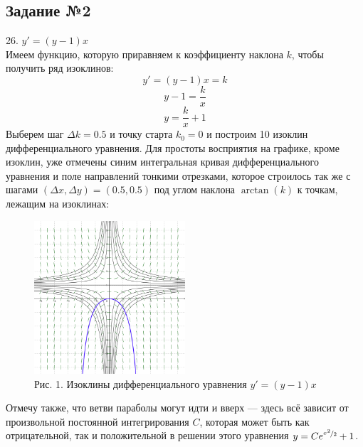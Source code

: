 \documentclass[a3paper,14pt]{article}
\begin{document}
\subsection*{\centering Задание №2}
26. $y'=(y-1)x$ \\
Имеем функцию, которую приравняем к коэффициенту наклона $k$, чтобы получить ряд изоклинов:
$$y'=(y-1)x=k$$
$$y-1=\frac{k}{x}$$
$$y=\frac{k}{x} + 1$$
Выберем шаг $\Delta k = 0.5$ и точку старта $k_0 = 0$ и построим 10 изоклин дифференциального уравнения. Для простоты восприятия на графике, кроме изоклин, уже отмечены синим интегральная кривая дифференциального уравнения и поле направлений тонкими отрезками, которое строилось так же с шагами $(\Delta x, \Delta y) = (0.5, 0.5)$ под углом наклона $\arctan(k)$ к точкам, лежащим на изоклинах:
\begin{figure}[h]
    \centering \includegraphics[width=0.5\textwidth]{isoclines.png}
    \caption{Рис. 1. Изоклины дифференциального уравнения $y'=(y-1)x$}
\end{figure}

\noindent Отмечу также, что ветви параболы могут идти и вверх --- здесь всё зависит от произвольной постоянной интегрирования $C$, которая может быть как отрицательной, так и положительной в решении этого уравнения $y = Ce^{\nicefrac{x^2}{2}}+1$. 
\end{document}

